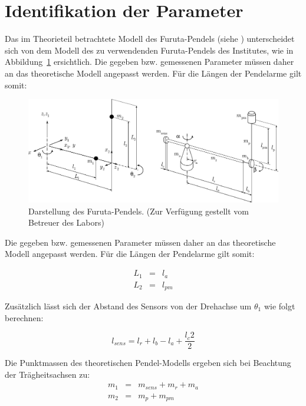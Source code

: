 \section{Identifikation der Parameter}
\label{sec.Parameter}

Das im Theorieteil betrachtete Modell des Furuta-Pendels (siehe \cite{Cazzolato.2011}) unterscheidet sich von dem Modell des zu verwendenden Furuta-Pendels des Institutes, wie in Abbildung~\ref{fig.FurutaPlant} ersichtlich.
Die gegeben bzw. gemessenen Parameter müssen daher an das theoretische Modell angepasst werden. Für die Längen der Pendelarme gilt somit:

\begin{figure}[htbp]
	\centering
	\includegraphics[width=1.\textwidth]{Grafiken/adelaideimagenew}
	\caption{Darstellung des Furuta-Pendels. (Zur Verfügung gestellt vom Betreuer des Labors) }
	\label{fig.FurutaPlant}
\end{figure}

Die gegeben bzw. gemessenen Parameter müssen daher an das theoretische Modell angepasst werden. Für die Längen der Pendelarme gilt somit:

\begin{eqnarray}
L_1 &=& l_a \nonumber \\
L_2 &=& l_{pm} \nonumber 
\end{eqnarray}

Zusätzlich lässt sich der Abstand des Sensors von der Drehachse um $\theta_1$  wie folgt berechnen:

\begin{equation}
l_{sens} = l_r+l_b-l_a+\dfrac{l_c2}{2}
\end{equation}

Die Punktmassen des theoretischen Pendel-Modells ergeben sich bei Beachtung der Trägheitsachsen zu:
\begin{eqnarray}
m_1 &=& m_{sens}+m_r+m_a \nonumber \\
m_2 &=& m_p+m_{pm}
\end{eqnarray}


